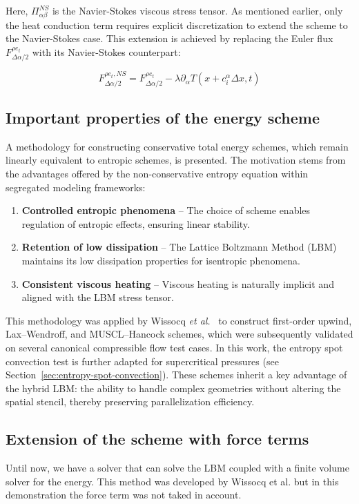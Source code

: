 Here, \( \Pi_{\alpha\beta}^{NS} \) is the Navier-Stokes viscous stress tensor.
As mentioned earlier, only the heat conduction term requires explicit
discretization to extend the scheme to the Navier-Stokes case. This extension is
achieved by replacing the Euler flux \( F_{\Delta\alpha/2}^{\rho e_t} \) with
its Navier-Stokes counterpart:

\begin{equation}
    F_{\Delta\alpha/2}^{\rho e_t, NS} = F_{\Delta\alpha/2}^{\rho e_t} - \lambda \partial_\alpha T(x + c_i^\alpha \Delta x, t)
\end{equation}


\subsection{Important properties of the energy scheme}
A methodology for constructing conservative total energy schemes, which remain
linearly equivalent to entropic schemes, is presented. The motivation stems from
the advantages offered by the non-conservative entropy equation within segregated
modeling frameworks:

\begin{enumerate}
    \item \textbf{Controlled entropic phenomena} -- The choice of scheme enables
    regulation of entropic effects, ensuring linear stability.
    \item \textbf{Retention of low dissipation} -- The Lattice Boltzmann Method (LBM)
    maintains its low dissipation properties for isentropic phenomena.
    \item \textbf{Consistent viscous heating} -- Viscous heating is naturally implicit
    and aligned with the LBM stress tensor.
\end{enumerate}

This methodology was applied by Wissocq \textit{et al.}~\cite{wissocq2019extended} to
construct first-order upwind, Lax--Wendroff, and MUSCL--Hancock schemes, which
were subsequently validated on several canonical compressible flow test cases.
In this work, the entropy spot convection test is further adapted for
supercritical pressures (see Section~\ref{sec:entropy-spot-convection}).
These schemes inherit a key advantage of the hybrid LBM: the ability to handle
complex geometries without altering the spatial stencil, thereby preserving
parallelization efficiency.


\subsection{Extension of the scheme with force terms}
Until now, we have a solver that can solve the LBM coupled with a finite volume
solver for the energy. This method was developed by Wissocq et al.
\cite{wissocq2022restoring} but in this demonstration the force term was not
taked in account. 

